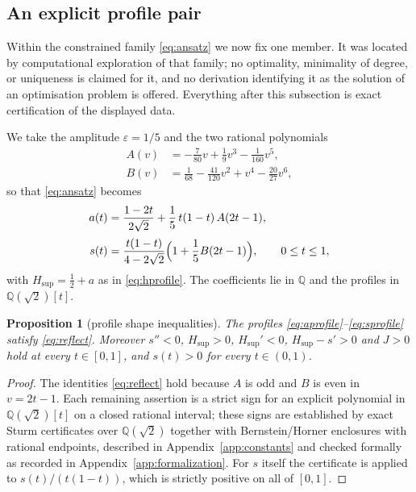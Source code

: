 \documentclass[11pt]{article}
\theoremstyle{plain}
\newtheorem{proposition}[theorem]{Proposition}
\theoremstyle{definition}
\theoremstyle{remark}
\newcommand{\Q}{\mathbb{Q}}
\newcommand{\Hsup}{H_{\mathrm{sup}}}
\begin{document}
\subsection{An explicit profile pair}

Within the constrained family \eqref{eq:ansatz} we now fix one member. It was
located by computational exploration of that family; no optimality, minimality
of degree, or uniqueness is claimed for it, and no derivation identifying it as
the solution of an optimisation problem is offered. Everything after this
subsection is exact certification of the displayed data.

We take the amplitude $\varepsilon=1/5$ and the two rational polynomials
\begin{align}
  A(v)&=-\frac{7}{80}v+\frac{1}{9}v^{3}-\frac{1}{160}v^{5},
  \label{eq:Apoly}\\[2pt]
  B(v)&=\frac{1}{68}-\frac{41}{120}v^{2}+v^{4}-\frac{20}{27}v^{6},
  \label{eq:Bpoly}
\end{align}
so that \eqref{eq:ansatz} becomes
\begin{align}
  a(t)&=\frac{1-2t}{2\sqrt2}+\frac15\,t(1-t)\,A(2t-1),
  \label{eq:aprofile}\\[2pt]
  s(t)&=\frac{t(1-t)}{4-2\sqrt2}\Bigl(1+\frac15B(2t-1)\Bigr),
  \qquad 0\le t\le1 ,
  \label{eq:sprofile}
\end{align}
with $\Hsup=\tfrac12+a$ as in \eqref{eq:hprofile}. The coefficients lie in $\Q$ and
the profiles in $\Q(\sqrt2)[t]$.

\begin{proposition}[profile shape inequalities]\label{prop:signs}
The profiles \eqref{eq:aprofile}--\eqref{eq:sprofile} satisfy
\eqref{eq:reflect}. Moreover $s''<0$, $\Hsup>0$, $\Hsup'<0$, $\Hsup-s'>0$ and
$J>0$ hold at every $t\in[0,1]$, and $s(t)>0$ for every $t\in(0,1)$.
\end{proposition}

\begin{proof}
The identities \eqref{eq:reflect} hold because $A$ is odd and $B$ is even in
$v=2t-1$. Each remaining assertion is a strict sign for an explicit polynomial
in $\Q(\sqrt2)[t]$ on a closed rational interval; these signs are established by
exact Sturm certificates over $\Q(\sqrt2)$ together with Bernstein/Horner
enclosures with rational endpoints, described in Appendix~\ref{app:constants}
and checked formally as recorded in Appendix~\ref{app:formalization}. For $s$
itself the certificate is applied to $s(t)/(t(1-t))$, which is strictly positive
on all of $[0,1]$.
\end{proof}
\end{document}
